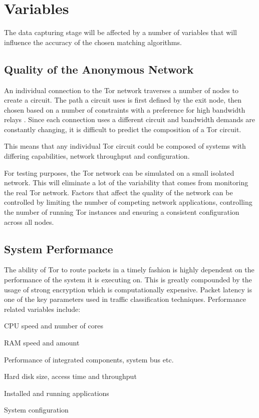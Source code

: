\documentclass{ecuthesis}
\begin{document}
\section{Variables}

The data capturing stage will be affected by a number of variables that will
influence the accuracy of the chosen matching algorithms.

\subsection{Quality of the Anonymous Network}

An individual connection to the Tor network traverses a number of nodes to
create a circuit. The path a circuit uses is first defined by the exit node,
then chosen based on a number of constraints with a preference for high
bandwidth relays \parencite{website:tor-path-selection}. Since each connection
uses a different circuit and bandwidth demands are constantly changing, it is
difficult to predict the composition of a Tor circuit.

This means that any individual Tor circuit could be composed of systems with
differing capabilities, network throughput and configuration.

For testing purposes, the Tor network can be simulated on a small isolated
network. This will eliminate a lot of the variability that comes from
monitoring the real Tor network. Factors that affect the quality of the network
can be controlled by limiting the number of competing network applications,
controlling the number of running Tor instances and ensuring a consistent
configuration across all nodes.

\subsection{System Performance}

The ability of Tor to route packets in a timely fashion is highly dependent on
the performance of the system it is executing on. This is greatly compounded by
the usage of strong encryption which is computationally expensive. Packet
latency is one of the key parameters used in traffic classification techniques.
Performance related variables include:

\begin{itemize*}
  \item CPU speed and number of cores
  \item RAM speed and amount
  \item Performance of integrated components, system bus etc.
  \item Hard disk size, access time and throughput
  \item Installed and running applications
  \item System configuration
\end{itemize*}
\end{document}
